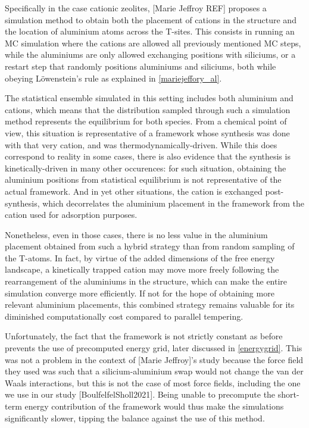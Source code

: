 \documentclass[main.tex]{subfiles}
\begin{document}
Specifically in the case cationic zeolites, [Marie Jeffroy REF] proposes a simulation method to obtain both the placement of cations in the structure and the location of aluminium atoms across the T-sites. This consists in running an MC simulation where the cations are allowed all previously mentioned MC steps, while the aluminiums are only allowed exchanging positions with siliciums, or a restart step that randomly positions aluminiums and siliciums, both while obeying L\"owenstein's rule as explained in \cref{mariejeffory_al}.

The statistical ensemble simulated in this setting includes both aluminium and cations, which means that the distribution sampled through such a simulation method represents the equilibrium for both species. From a chemical point of view, this situation is representative of a framework whose synthesis was done with that very cation, and was thermodynamically-driven. While this does correspond to reality in some cases, there is also evidence that the synthesis is kinetically-driven in many other occurences: for such situation, obtaining the aluminium positions from statistical equilibrium is not representative of the actual framework. And in yet other situations, the cation is exchanged post-synthesis, which decorrelates the aluminium placement in the framework from the cation used for adsorption purposes.

Nonetheless, even in those cases, there is no less value in the aluminium placement obtained from such a hybrid strategy than from random sampling of the T-atoms. In fact, by virtue of the added dimensions of the free energy landscape, a kinetically trapped cation may move more freely following the rearrangement of the aluminiums in the structure, which can make the entire simulation converge more efficiently. If not for the hope of obtaining more relevant aluminium placements, this combined strategy remains valuable for its diminished computationally cost compared to parallel tempering.

Unfortunately, the fact that the framework is not strictly constant as before prevents the use of precomputed energy grid, later discussed in \cref{energygrid}. This was not a problem in the context of [Marie Jeffroy]'s study because the force field they used was such that a silicium-aluminium swap would not change the van der Waals interactions, but this is not the case of most force fields, including the one we use in our study [BoulfelfelSholl2021]. Being unable to precompute the short-term energy contribution of the framework would thus make the simulations significantly slower, tipping the balance against the use of this method.
\end{document}
